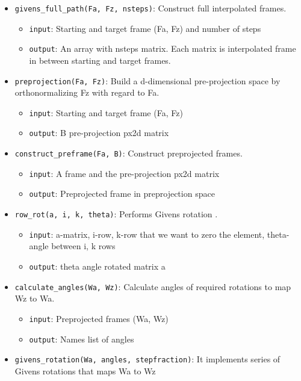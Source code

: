 \begin{itemize}
\tightlist
\item
  \texttt{givens\_full\_path(Fa,\ Fz,\ nsteps)}: Construct full
  interpolated frames.

  \begin{itemize}
  \tightlist
  \item
    \texttt{input}: Starting and target frame (Fa, Fz) and number of
    steps
  \item
    \texttt{output}: An array with nsteps matrix. Each matrix is
    interpolated frame in between starting and target frames.
  \end{itemize}
\item
  \texttt{preprojection(Fa,\ Fz)}: Build a d-dimensional pre-projection
  space by orthonormalizing Fz with regard to Fa.

  \begin{itemize}
  \tightlist
  \item
    \texttt{input}: Starting and target frame (Fa, Fz)
  \item
    \texttt{output}: B pre-projection px2d matrix
  \end{itemize}
\item
  \texttt{construct\_preframe(Fa,\ B)}: Construct preprojected frames.

  \begin{itemize}
  \tightlist
  \item
    \texttt{input}: A frame and the pre-projection px2d matrix
  \item
    \texttt{output}: Preprojected frame in preprojection space
  \end{itemize}
\item
  \texttt{row\_rot(a,\ i,\ k,\ theta)}: Performs Givens rotation
  \citep{matrix_computation}.

  \begin{itemize}
  \tightlist
  \item
    \texttt{input}: a-matrix, i-row, k-row that we want to zero the
    element, theta-angle between i, k rows
  \item
    \texttt{output}: theta angle rotated matrix a
  \end{itemize}
\item
  \texttt{calculate\_angles(Wa,\ Wz)}: Calculate angles of required
  rotations to map Wz to Wa.

  \begin{itemize}
  \tightlist
  \item
    \texttt{input}: Preprojected frames (Wa, Wz)
  \item
    \texttt{output}: Names list of angles
  \end{itemize}
\item
  \texttt{givens\_rotation(Wa,\ angles,\ stepfraction)}: It implements
  series of Givens rotations that maps Wa to Wz


\end{itemize}
